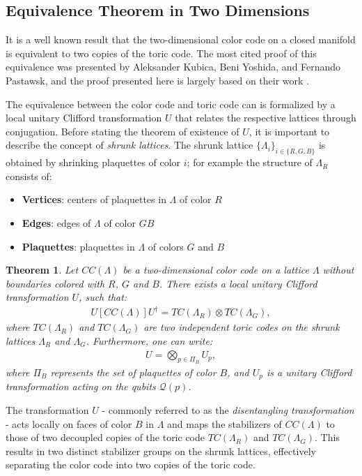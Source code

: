 \documentclass[12pt]{article}
\newtheorem{theorem}{Theorem}[section]
\theoremstyle{definition}
\begin{document}
\subsection{Equivalence Theorem in Two Dimensions}
It is a well known result that the two-dimensional color code on a closed manifold is equivalent to two copies of the toric code. The most cited proof of this equivalence was presented by Aleksander Kubica, Beni Yoshida, and Fernando Pastawsk, and the proof presented here is largely based on their work \cite{kubica2015}.\newline

The equivalence between the color code and toric code can is formalized by a local unitary Clifford transformation $U$ that relates the respective lattices through conjugation. Before stating the theorem of existence of $U$, it is important to describe the concept of \emph{shrunk lattices}. The shrunk lattice $\{\Lambda_i\}_{i\in\{R,G,B\}}$ is obtained by shrinking plaquettes of color $i$; for example the structure of $\Lambda_R$ consists of:
    \begin{itemize}
        \item \textbf{Vertices}: centers of plaquettes in $\Lambda$ of color $R$
        \item \textbf{Edges}: edges of $\Lambda$ of color $GB$
        \item \textbf{Plaquettes}: plaquettes in $\Lambda$ of colors $G$ and $B$
    \end{itemize}
    \begin{theorem}
    Let $CC(\Lambda)$ be a two-dimensional color code on a lattice $\Lambda$ without boundaries colored with $R$, $G$ and $B$. There exists a local unitary Clifford transformation $U$, such that:
        \begin{align}
            U[CC(\Lambda)]U^\dagger = TC(\Lambda_R)\otimes TC(\Lambda_G),
        \end{align}
    where $TC(\Lambda_R)$ and $TC(\Lambda_G)$ are two independent toric codes on the shrunk lattices $\Lambda_R$ and $\Lambda_G$. Furthermore, one can write:
        \begin{align}
            U = \bigotimes_{p\in\Pi_B}U_p,
        \end{align}
    where $\Pi_B$ represents the set of plaquettes of color $B$, and $U_p$ is a unitary Clifford transformation acting on the qubits $\mathcal{Q}(p)$.
    \end{theorem}

The transformation $U$ - commonly referred to as the \emph{disentangling transformation} - acts locally on faces of color $B$ in $\Lambda$ and maps the stabilizers of $CC(\Lambda)$ to those of two decoupled copies of the toric code $TC(\Lambda_R)$ and $TC(\Lambda_G)$. This results in two distinct stabilizer groups on the shrunk lattices, effectively separating the color code into two copies of the toric code.\newline
\end{document}
